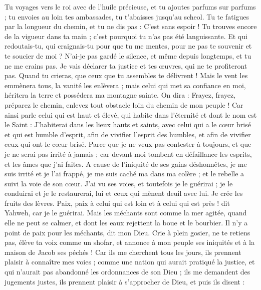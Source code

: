 \begin{multicols}{2}
Tu voyages vers le roi avec de l'huile précieuse, et tu ajoutes parfums sur parfums ; tu envoies au loin tes ambassades, tu t'abaisses jusqu'au scheol.
Tu te fatigues par la longueur du chemin, et tu ne dis pas : C'est sans espoir ! Tu trouves encore de la vigueur dans ta main ; c'est pourquoi tu n'as pas été languissante.
Et qui redoutais-tu, qui craignais-tu pour que tu me mentes, pour ne pas te souvenir et te soucier de moi ? N'ai-je pas gardé le silence, et même depuis longtemps, et tu ne me crains pas.
Je vais déclarer ta justice et tes œuvres, qui ne te profiteront pas.
Quand tu crieras, que ceux que tu assembles te délivrent ! Mais le vent les emmènera tous, la vanité les enlèvera ; mais celui qui met sa confiance en moi, héritera la terre et possédera ma montagne sainte.
On dira : Frayez, frayez, préparez le chemin, enlevez tout obstacle loin du chemin de mon peuple !
Car ainsi parle celui qui est haut et élevé, qui habite dans l'éternité et dont le nom est le Saint : J'habiterai dans les lieux hauts et saints, avec celui qui a le cœur brisé et qui est humble d'esprit, afin de vivifier l'esprit des humbles, et afin de vivifier ceux qui ont le cœur brisé.
Parce que je ne veux pas contester à toujours, et que je ne serai pas irrité à jamais ; car devant moi tombent en défaillance les esprits, et les âmes que j'ai faites.
A cause de l'iniquité de ses gains déshonnêtes, je me suis irrité et je l'ai frappé, je me suis caché ma dans ma colère ; et le rebelle a suivi la voie de son cœur.
J'ai vu ses voies, et toutefois je le guérirai ; je le conduirai et je le restaurerai, lui et ceux qui mènent deuil avec lui.
Je crée les fruits des lèvres. Paix, paix à celui qui est loin et à celui qui est près ! dit Yahweh, car je le guérirai.
Mais les méchants sont comme la mer agitée, quand elle ne peut se calmer, et dont les eaux rejettent la boue et le bourbier.
Il n'y a point de paix pour les méchants, dit mon Dieu.
\VerseOne{}Crie à plein gosier, ne te retiens pas, élève ta voix comme un shofar, et annonce à mon peuple ses iniquités et à la maison de Jacob ses péchés !
Car ils me cherchent tous les jours, ils prennent plaisir à connaître mes voies ; comme une nation qui aurait pratiqué la justice, et qui n'aurait pas abandonné les ordonnances de son Dieu ; ils me demandent des jugements justes, ils prennent plaisir à s'approcher de Dieu, et puis ils disent :

\end{multicols}
